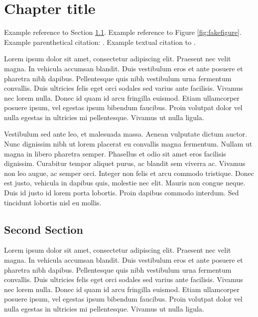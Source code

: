 \chapter{Chapter title}
\label{sec:firstchap}
\thispagestyle{myheadings}

Example reference to Section \ref{sec:fakesection}.  Example reference to Figure \ref{fig:fakefigure}.  Example parenthetical citation: \citep[e.g][for example]{gosling_1993}.   Example textual citation to \citet[][]{gosling_1993}.  

Lorem ipsum dolor sit amet, consectetur adipiscing elit. Praesent nec velit magna. In vehicula accumsan blandit. Duis vestibulum eros et ante posuere et pharetra nibh dapibus. Pellentesque quis nibh vestibulum urna fermentum convallis. Duis ultricies felis eget orci sodales sed varius ante facilisis. Vivamus nec lorem nulla. Donec id quam id arcu fringilla euismod. Etiam ullamcorper posuere ipsum, vel egestas ipsum bibendum faucibus. Proin volutpat dolor vel nulla egestas in ultricies mi pellentesque. Vivamus ut nulla ligula.

Vestibulum sed ante leo, et malesuada massa. Aenean vulputate dictum auctor. Nunc dignissim nibh ut lorem placerat eu convallis magna fermentum. Nullam ut magna in libero pharetra semper. Phasellus et odio sit amet eros facilisis dignissim. Curabitur tempor aliquet purus, ac blandit sem viverra ac. Vivamus non leo augue, ac semper orci. Integer non felis et arcu commodo tristique. Donec est justo, vehicula in dapibus quis, molestie nec elit. Mauris non congue neque. Duis id justo id lorem porta lobortis. Proin dapibus commodo interdum. Sed tincidunt lobortis nisl eu mollis.


\section{Second Section}
\label{sec:fakesection}
Lorem ipsum dolor sit amet, consectetur adipiscing elit. Praesent nec velit magna. In vehicula accumsan blandit. Duis vestibulum eros et ante posuere et pharetra nibh dapibus. Pellentesque quis nibh vestibulum urna fermentum convallis. Duis ultricies felis eget orci sodales sed varius ante facilisis. Vivamus nec lorem nulla. Donec id quam id arcu fringilla euismod. Etiam ullamcorper posuere ipsum, vel egestas ipsum bibendum faucibus. Proin volutpat dolor vel nulla egestas in ultricies mi pellentesque. Vivamus ut nulla ligula.


